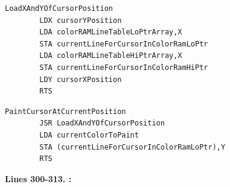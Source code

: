 \bigskip
\begin{lstlisting}[caption= Load the X and Y position and set up \icode{currentLineForCursorInColorRamLoPtr/currentLineForCursorInColorRamHiPtr}
for painting the cursor.]
LoadXAndYOfCursorPosition   
        LDX cursorYPosition
        LDA colorRAMLineTableLoPtrArray,X
        STA currentLineForCursorInColorRamLoPtr
        LDA colorRAMLineTableHiPtrArray,X
        STA currentLineForCursorInColorRamHiPtr
        LDY cursorXPosition
        RTS 
\end{lstlisting}
\bigskip
\begin{lstlisting}[caption = Paint the cursor.]
PaintCursorAtCurrentPosition   
        JSR LoadXAndYOfCursorPosition
        LDA currentColorToPaint
        STA (currentLineForCursorInColorRamLoPtr),Y
        RTS 
\end{lstlisting}
\clearpage
\textbf{Lines 300-313. :} 

